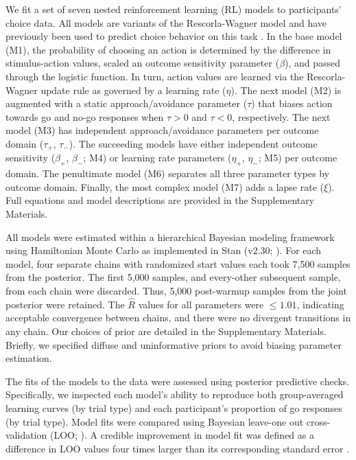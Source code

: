 \documentclass[a4paper,12pt]{article}
\begin{document}
\begin{refsection}[main]
We fit a set of seven nested reinforcement learning (RL) models to participants' choice data. All models are variants of the Rescorla-Wagner model and have previously been used to predict choice behavior on this task \cite{guitart2012go, mkrtchian2017modeling}. In the base model (M1), the probability of choosing an action is determined by the difference in stimulus-action values, scaled an outcome sensitivity parameter ($\beta$), and passed through the logistic function. In turn, action values are learned via the Rescorla-Wagner update rule as governed by a learning rate ($\eta$). The next model (M2) is augmented with a static approach/avoidance parameter ($\tau$) that biases action towards go and no-go responses when $\tau > 0$ and $\tau < 0$, respectively. The next model (M3) has independent approach/avoidance parameters per outcome domain ($\tau_+$, $\tau_-$). The succeeding models have either independent outcome sensitivity  ($\beta_+$, $\beta_-$; M4) or learning rate parameters ($\eta_+$, $\eta_-$; M5) per outcome domain. The penultimate model (M6) separates all three parameter types by outcome domain. Finally, the most complex model (M7) adds a lapse rate ($\xi$). Full equations and model descriptions are provided in the Supplementary Materials.

All models were estimated within a hierarchical Bayesian modeling framework using Hamiltonian Monte Carlo as implemented in Stan (v2.30; \cite{carpenter2017stan}). For each model, four separate chains with randomized start values each took 7,500 samples from the posterior. The first 5,000 samples, and every-other subsequent sample, from each chain were discarded. Thus, 5,000 post-warmup samples from the joint posterior were retained. The $\hat{R}$ values for all parameters were $\leq 1.01$, indicating acceptable convergence between chains, and there were no divergent transitions in any chain. Our choices of prior are detailed in the Supplementary Materials. Briefly, we specified diffuse and uninformative priors to avoid biasing parameter estimation.

The fits of the models to the data were assessed using posterior predictive checks. Specifically, we inspected each model's ability to reproduce both group-averaged learning curves (by trial type) and each participant's proportion of go responses (by trial type). Model fits were compared using Bayesian leave-one out cross-validation (LOO; \cite{vehtari2017practical}). A credible improvement in model fit was defined as a difference in LOO values four times larger than its corresponding standard error \cite{Vehtari_undated-tc}.


\end{refsection}
\end{document}
